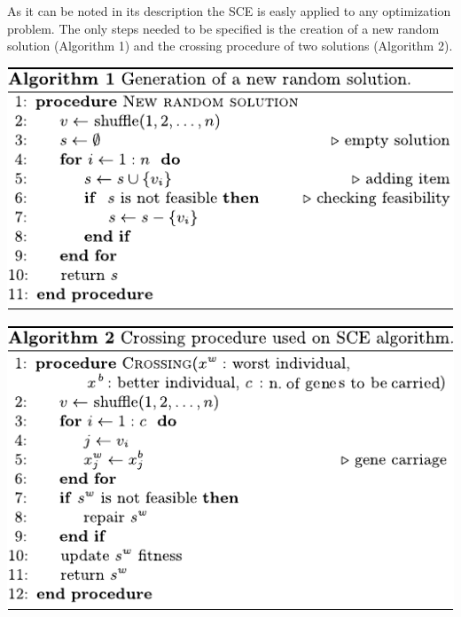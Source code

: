 As it can be noted in its description the SCE is easly applied to any
optimization problem.
The only steps needed to be specified is the creation of a new random
solution (Algorithm 1) and the crossing procedure of two solutions (Algorithm 2).
\begin{center}
\begin{minipage}[c]{0.5\linewidth}
  \begin{center}
    \includegraphics[width=0.87\linewidth]{imgs/alg-new}\\[3mm]
  \end{center}
\end{minipage}
\begin{minipage}[c]{0.4\linewidth}
  \begin{center}
    \includegraphics[width=0.95\linewidth]{imgs/alg-cross}
  \end{center}
\end{minipage}
\end{center}
